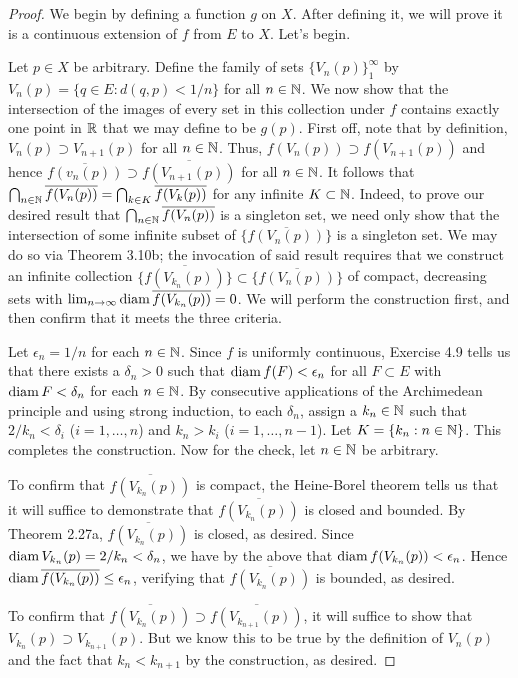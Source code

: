 \documentclass[../psets.tex]{subfiles}
\begin{document}
\begin{enumerate}[label={\textbf{\arabic*.}}]
\begin{proof}
        We begin by defining a function $g$ on $X$. After defining it, we will prove it is a continuous extension of $f$ from $E$ to $X$. Let's begin.\par\smallskip
        Let $p\in X$ be arbitrary. Define the family of sets $\{V_n(p)\}_1^\infty$ by $V_n(p)=\{q\in E:d(q,p)<1/n\}$ for all $n\in\mathbb{N}$. We now show that the intersection of the images of every set in this collection under $f$ contains exactly one point in $\mathbb{R}$ that we may define to be $g(p)$. First off, note that by definition, $V_n(p)\supset V_{n+1}(p)$ for all $n\in\mathbb{N}$. Thus, $f(V_n(p))\supset f(V_{n+1}(p))$ and hence $\overline{f(v_n(p))}\supset\overline{f(V_{n+1}(p))}$ for all $n\in\mathbb{N}$. It follows that $\bigcap_{n\in\mathbb{N}}\overline{f(V_n(p))}=\bigcap_{k\in K}\overline{f(V_k(p))}$ for any infinite $K\subset\mathbb{N}$. Indeed, to prove our desired result that $\bigcap_{n\in\mathbb{N}}\overline{f(V_n(p))}$ is a singleton set, we need only show that the intersection of some infinite subset of $\{\overline{f(V_n(p))}\}$ is a singleton set. We may do so via Theorem 3.10b; the invocation of said result requires that we construct an infinite collection $\{\overline{f(V_{k_n}(p))}\}\subset\{\overline{f(V_n(p))}\}$ of compact, decreasing sets with $\lim_{n\to\infty}\operatorname{diam}\overline{f(V_{k_n}(p))}=0$. We will perform the construction first, and then confirm that it meets the three criteria.\par
        Let $\epsilon_n=1/n$ for each $n\in\mathbb{N}$. Since $f$ is uniformly continuous, Exercise 4.9 tells us that there exists a $\delta_n>0$ such that $\operatorname{diam} f(F)<\epsilon_n$ for all $F\subset E$ with $\operatorname{diam} F<\delta_n$ for each $n\in\mathbb{N}$. By consecutive applications of the Archimedean principle and using strong induction, to each $\delta_n$, assign a $k_n\in\mathbb{N}$ such that $2/k_n<\delta_i$ ($i=1,\dots,n$) and $k_n>k_i$ ($i=1,\dots,n-1$). Let $K=\{k_n:n\in\mathbb{N}\}$. This completes the construction. Now for the check, let $n\in\mathbb{N}$ be arbitrary.\par
        To confirm that $\overline{f(V_{k_n}(p))}$ is compact, the Heine-Borel theorem tells us that it will suffice to demonstrate that $\overline{f(V_{k_n}(p))}$ is closed and bounded. By Theorem 2.27a, $\overline{f(V_{k_n}(p))}$ is closed, as desired. Since $\operatorname{diam} V_{k_n}(p)=2/k_n<\delta_n$, we have by the above that $\operatorname{diam} f(V_{k_n}(p))<\epsilon_n$. Hence $\operatorname{diam}\overline{f(V_{k_n}(p))}\leq\epsilon_n$, verifying that $\overline{f(V_{k_n}(p))}$ is bounded, as desired.\par
        To confirm that $\overline{f(V_{k_n}(p))}\supset\overline{f(V_{k_{n+1}}(p))}$, it will suffice to show that $V_{k_n}(p)\supset V_{k_{n+1}}(p)$. But we know this to be true by the definition of $V_n(p)$ and the fact that $k_n<k_{n+1}$ by the construction, as desired.\par

\end{proof}
\end{enumerate}
\end{document}
